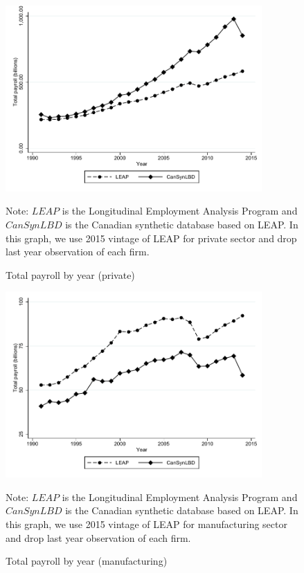 \documentclass{article}
\begin{document}
\begin{figure} [H]
\centering
\caption{Total payroll by year (private)} \label{TotalPayrollPrivate}
\includegraphics[height=2.8in, width=.7\linewidth]{graphs/Total_payroll_by_year_private_bw.pdf} 
\begin{minipage}{0.85\textwidth}
{\footnotesize Note: $LEAP$ is the Longitudinal Employment Analysis Program and $CanSynLBD$ is the Canadian synthetic database based on LEAP. In this graph, we use 2015 vintage of LEAP for private sector and drop last year observation of each firm. \par}
\end{minipage}
\end{figure}
\begin{figure} [H]
\centering
\caption{Total payroll by year (manufacturing)} \label{TotalPayrollManufacturing}
\includegraphics[height=2.8in, width=.7\linewidth]{graphs/Total_payroll_by_year_manufacturing_bw.pdf} 
\begin{minipage}{0.85\textwidth}
{\footnotesize Note: $LEAP$ is the Longitudinal Employment Analysis Program and $CanSynLBD$ is the Canadian synthetic database based on LEAP. In this graph, we use 2015 vintage of LEAP for manufacturing sector and drop last year observation of each firm. \par}
\end{minipage}
\end{figure}
\end{document}
